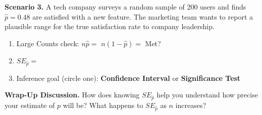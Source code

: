 \documentclass[10pt]{article}
\begin{document}
\vspace{0.15in}

\textbf{Scenario 3.} A tech company surveys a random sample of 200 users and finds
$\hat p = 0.48$ are satisfied with a new feature. The marketing team wants to report
a plausible range for the true satisfaction rate to company leadership.

\begin{enumerate}[label=\alph*.]
  \item Large Counts check: $n\hat p = $ \blank{2.5cm} \quad $n(1-\hat p) = $ \blank{2.5cm} \quad Met? \blank{1.5cm}
  \item $SE_{\hat p} = $ \blank{6cm}
  \item Inference goal (circle one): \quad \textbf{Confidence Interval} \quad or \quad \textbf{Significance Test}
\end{enumerate}

\vspace{0.15in}

\begin{reflectionbox}
\textbf{Wrap-Up Discussion.} How does knowing $SE_{\hat p}$ help you understand how
precise your estimate of $p$ will be? What happens to $SE_{\hat p}$ as $n$ increases?
\end{reflectionbox}
\end{document}
